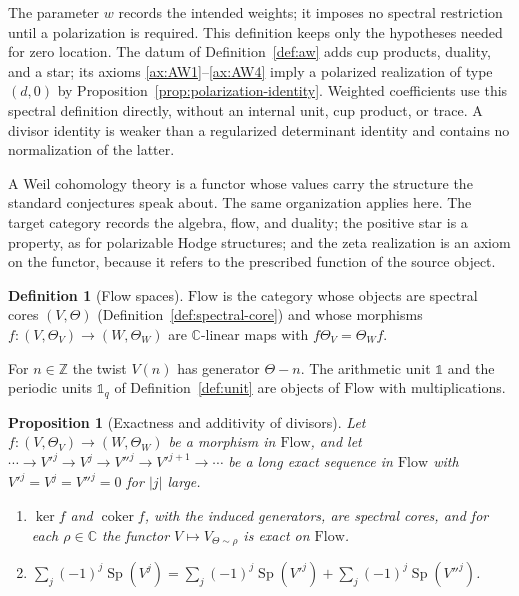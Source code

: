 \documentclass[11pt]{amsart}
\theoremstyle{plain}
\newtheorem{proposition}[theorem]{Proposition}
\theoremstyle{definition}
\newtheorem{definition}[theorem]{Definition}
\theoremstyle{remark}
\numberwithin{equation}{section}
\newcommand{\C}{\mathbb{C}}
\newcommand{\Z}{\mathbb{Z}}
\newcommand{\Flow}{\mathrm{Flow}}
\begin{document}
The parameter $w$ records the intended weights; it imposes no spectral
restriction until a polarization is required. This definition keeps
only the hypotheses needed for zero location. The
datum of Definition~\ref{def:aw} adds cup products, duality, and a star;
its axioms \ref{ax:AW1}--\ref{ax:AW4} imply a polarized realization
of type $(d,0)$ by Proposition~\ref{prop:polarization-identity}.
Weighted coefficients use this spectral definition directly, without
an internal unit, cup product, or trace. A divisor identity is
weaker than a regularized determinant identity and contains no
normalization of the latter.

A Weil cohomology theory is a functor whose values carry the structure
the standard conjectures speak about. The same organization applies
here. The target category records the algebra, flow, and duality; the
positive star is a property, as for polarizable Hodge structures; and
the zeta realization is an axiom on the functor, because it refers to
the prescribed function of the source object.

\begin{definition}[Flow spaces]\label{def:flow-category}
$\Flow$ is the category whose objects are spectral cores $(V,\Theta)$
(Definition~\ref{def:spectral-core}) and whose morphisms
$f:(V,\Theta_V)\to(W,\Theta_W)$ are $\C$-linear maps with
$f\Theta_V=\Theta_Wf$.
\end{definition}

For $n\in\Z$ the twist $V(n)$ has generator $\Theta-n$. The arithmetic
unit $\mathbb 1$ and the periodic units $\mathbb 1_q$ of
Definition~\ref{def:unit} are objects of $\Flow$ with
multiplications.

\begin{proposition}[Exactness and additivity of divisors]
\label{prop:flow-exact}
Let $f:(V,\Theta_V)\to(W,\Theta_W)$ be a morphism in $\Flow$, and let
$\cdots\to V'^j\to V^j\to V''^j\to V'^{j+1}\to\cdots$ be a long exact
sequence in $\Flow$ with $V'^j=V^j=V''^j=0$ for $|j|$ large.
\begin{enumerate}[label=(\alph*)]
\item\label{item:flow-kernels} $\ker f$ and $\operatorname{coker}f$,
  with the induced generators, are spectral cores, and for each
  $\rho\in\C$ the functor $V\mapsto V_{\Theta\sim\rho}$ is exact on
  $\Flow$.
\item\label{item:flow-additive}
  $\sum_j(-1)^j\operatorname{Sp}(V^j)
   =\sum_j(-1)^j\operatorname{Sp}(V'^j)
   +\sum_j(-1)^j\operatorname{Sp}(V''^j)$.
\end{enumerate}
\end{proposition}
\end{document}
